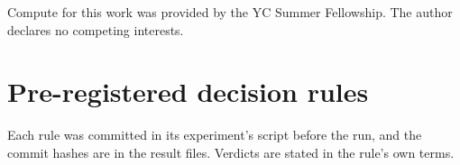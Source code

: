 \documentclass{article}
\begin{document}
\begin{ack}
Compute for this work was provided by the YC Summer Fellowship. The author declares no
competing interests.
\end{ack}

{\small


}

\clearpage
\appendix

\section{Pre-registered decision rules}
\label{app:rules}

Each rule was committed in its experiment's script before the run, and the commit hashes are in the
result files. Verdicts are stated in the rule's own terms.
\end{document}
